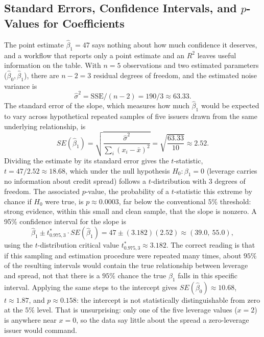 \documentclass[../ai_in_finance]{subfiles}
\begin{document}
\subsection{Standard Errors, Confidence Intervals, and $p$-Values for Coefficients}
\label{sec:regression-inference}

The point estimate $\hat\beta_1 = 47$ says nothing about how much confidence it deserves, and a workflow that reports only a point estimate and an $R^2$ leaves useful information on the table. With $n=5$ observations and two estimated parameters ($\hat\beta_0,\hat\beta_1$), there are $n-2=3$ residual degrees of freedom, and the estimated noise variance is
$$\hat\sigma^2 = \text{SSE}/(n-2) = 190/3 \approx 63.33.$$
The standard error of the slope, which measures how much $\hat\beta_1$ would be expected to vary across hypothetical repeated samples of five issuers drawn from the same underlying relationship, is
\begin{equation*}
SE(\hat\beta_1) = \sqrt{\frac{\hat\sigma^2}{\sum_i (x_i-\bar x)^2}} = \sqrt{\frac{63.33}{10}} \approx 2.52.
\end{equation*}
Dividing the estimate by its standard error gives the $t$-statistic, $t = 47/2.52 \approx 18.68$, which under the null hypothesis $H_0: \beta_1 = 0$ (leverage carries no information about credit spread) follows a $t$-distribution with $3$ degrees of freedom. The associated $p$-value, the probability of a $t$-statistic this extreme by chance if $H_0$ were true, is $p \approx 0.0003$, far below the conventional $5\%$ threshold: strong evidence, within this small and clean sample, that the slope is nonzero. A 95\% confidence interval for the slope is
\begin{equation*}
\hat\beta_1 \pm t^*_{0.975,3}\cdot SE(\hat\beta_1) = 47 \pm (3.182)(2.52) \approx (39.0,\ 55.0),
\end{equation*}
using the $t$-distribution critical value $t^*_{0.975,3}\approx 3.182$. The correct reading is that if this sampling and estimation procedure were repeated many times, about $95\%$ of the resulting intervals would contain the true relationship between leverage and spread, not that there is a $95\%$ chance the true $\beta_1$ falls in this specific interval. Applying the same steps to the intercept gives $SE(\hat\beta_0) \approx 10.68$, $t \approx 1.87$, and $p \approx 0.158$: the intercept is not statistically distinguishable from zero at the $5\%$ level. That is unsurprising: only one of the five leverage values ($x=2$) is anywhere near $x=0$, so the data say little about the spread a zero-leverage issuer would command.
\end{document}

